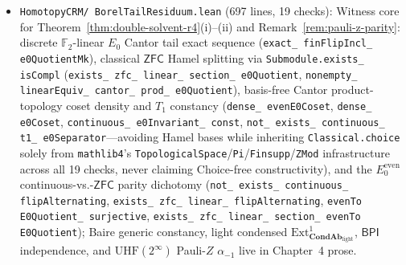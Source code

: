\begin{itemize}
  \item \texttt{HomotopyCRM/ BorelTailResiduum.lean} (697 lines, 19 checks): Witness core for Theorem~\ref{thm:double-solvent-r4}(i)--(ii) and Remark~\ref{rem:pauli-z-parity}: discrete $\mathbb{F}_2$-linear $E_0$ Cantor tail exact sequence (\texttt{exact\_ finFlipIncl\_ e0QuotientMk}), classical $\mathsf{ZFC}$ Hamel splitting via \texttt{Submodule.exists\_ isCompl} (\texttt{exists\_ zfc\_ linear\_ section\_ e0Quotient}, \texttt{nonempty\_ linearEquiv\_ cantor\_ prod\_ e0Quotient}), basis-free Cantor product-topology coset density and $T_1$ constancy (\texttt{dense\_ evenE0Coset}, \texttt{dense\_ e0Coset}, \texttt{continuous\_ e0Invariant\_ const}, \texttt{not\_ exists\_ continuous\_ t1\_ e0Separator}---avoiding Hamel bases while inheriting \texttt{Classical.choice} solely from \texttt{mathlib4}'s \texttt{TopologicalSpace}/\texttt{Pi}/\texttt{Finsupp}/\texttt{ZMod} infrastructure across all 19 checks, never claiming Choice-free constructivity), and the $E_0^{\mathrm{even}}$ continuous-vs.-$\mathsf{ZFC}$ parity dichotomy (\texttt{not\_ exists\_ continuous\_ flipAlternating}, \texttt{exists\_ zfc\_ linear\_ flipAlternating}, \texttt{evenTo E0Quotient\_ surjective}, \texttt{exists\_ zfc\_ linear\_ section\_ evenTo E0Quotient}); Baire generic constancy, light condensed $\mathrm{Ext}^1_{\mathbf{CondAb}_{\mathrm{light}}}$, $\mathsf{BPI}$ independence, and $\mathrm{UHF}(2^\infty)$ Pauli-$Z$ $\alpha_{-1}$ live in Chapter~4 prose.

\end{itemize}

